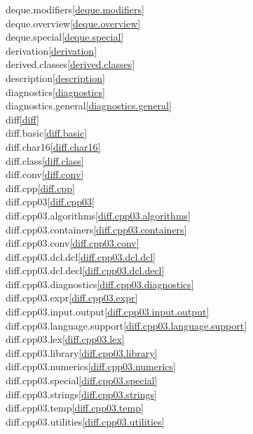 \begin{multicols}{2}
deque.modifiers\quad\ref{deque.modifiers}\\
deque.overview\quad\ref{deque.overview}\\
deque.special\quad\ref{deque.special}\\
derivation\quad\ref{derivation}\\
derived.classes\quad\ref{derived.classes}\\
description\quad\ref{description}\\
diagnostics\quad\ref{diagnostics}\\
diagnostics.general\quad\ref{diagnostics.general}\\
diff\quad\ref{diff}\\
diff.basic\quad\ref{diff.basic}\\
diff.char16\quad\ref{diff.char16}\\
diff.class\quad\ref{diff.class}\\
diff.conv\quad\ref{diff.conv}\\
diff.cpp\quad\ref{diff.cpp}\\
diff.cpp03\quad\ref{diff.cpp03}\\
diff.cpp03.algorithms\quad\ref{diff.cpp03.algorithms}\\
diff.cpp03.containers\quad\ref{diff.cpp03.containers}\\
diff.cpp03.conv\quad\ref{diff.cpp03.conv}\\
diff.cpp03.dcl.dcl\quad\ref{diff.cpp03.dcl.dcl}\\
diff.cpp03.dcl.decl\quad\ref{diff.cpp03.dcl.decl}\\
diff.cpp03.diagnostics\quad\ref{diff.cpp03.diagnostics}\\
diff.cpp03.expr\quad\ref{diff.cpp03.expr}\\
diff.cpp03.input.output\quad\ref{diff.cpp03.input.output}\\
diff.cpp03.language.support\quad\ref{diff.cpp03.language.support}\\
diff.cpp03.lex\quad\ref{diff.cpp03.lex}\\
diff.cpp03.library\quad\ref{diff.cpp03.library}\\
diff.cpp03.numerics\quad\ref{diff.cpp03.numerics}\\
diff.cpp03.special\quad\ref{diff.cpp03.special}\\
diff.cpp03.strings\quad\ref{diff.cpp03.strings}\\
diff.cpp03.temp\quad\ref{diff.cpp03.temp}\\
diff.cpp03.utilities\quad\ref{diff.cpp03.utilities}\\

\end{multicols}
